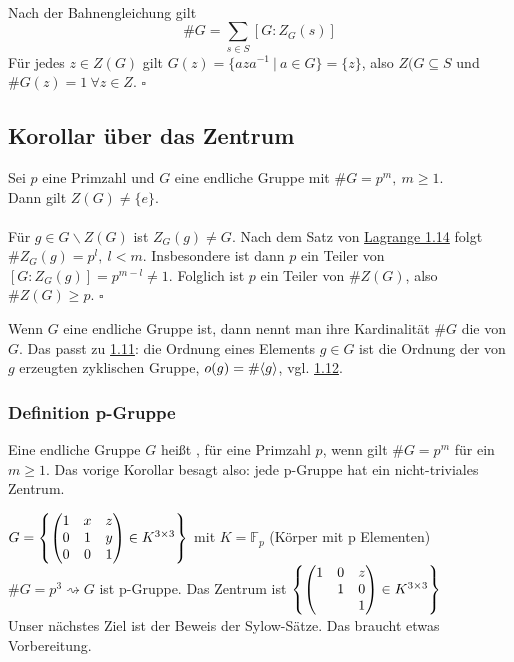 \\
Nach der Bahnengleichung gilt \[\#G=\sum_{s\in S}[G:Z_G(s)] \]
Für jedes $z\in Z(G)$ gilt $G(z)=\{aza^{-1}~|~a\in G \}=\{z\}$, also $Z(G\subseteq S$ und $\#G(z)=1~\forall z\in Z$.
\hfill $\square$


\subsection{Korollar über das Zentrum}
\label{sub:kor_zentrum}
Sei $p$ eine Primzahl und $G$ eine endliche Gruppe mit $\#G=p^m,~m\ge 1$.\\
Dann gilt $Z(G)\not= \{e\}$.\\

\\
Für $g\in G\backslash Z(G)$ ist $Z_G(g)\not= G$. Nach dem Satz von \hyperref[sub:satz_von_lagrange]{Lagrange 1.14} folgt $\#Z_G(g)=p^l,~l<m$. Insbesondere ist dann $p$ ein Teiler von $[G:Z_G(g)]=p^{m-l}\not=1$. Folglich ist $p$ ein Teiler von $\#Z(G)$, also $\#Z(G)\ge p$.
\hfill $\square$

Wenn $G$ eine endliche Gruppe ist, dann nennt man ihre Kardinalität $\#G$ die  von $G$. Das passt zu \hyperref[sub:def_zyklische_gruppen]{1.11}: die Ordnung eines Elements $g\in G$ ist die Ordnung der von $g$ erzeugten zyklischen Gruppe, $o(g)=\#\langle g \rangle$, vgl. \hyperref[sub:zyklische_gruppen]{1.12}.

\subsubsection*{Definition p-Gruppe}
Eine endliche Gruppe $G$ heißt , für eine Primzahl $p$, wenn gilt $\#G=p^m$ für ein $m\ge 1$. Das vorige Korollar besagt also: jede p-Gruppe hat ein nicht-triviales Zentrum.

$G=\left\{\begin{pmatrix}
1&x&z\\ 0&1&y\\ 0&0&1 \end{pmatrix} \in K^{3\times 3}\right\}$ mit $K=\mathds{F}_p$ (Körper mit p Elementen)\\
$\#G=p^3 \rightsquigarrow G$ ist p-Gruppe. Das Zentrum ist $\left\{\begin{pmatrix}1&0&z\\&1&0\\&&1\end{pmatrix} \in K^{3\times 3}\right\}$\\
Unser nächstes Ziel ist der Beweis der Sylow-Sätze. Das braucht etwas Vorbereitung.

